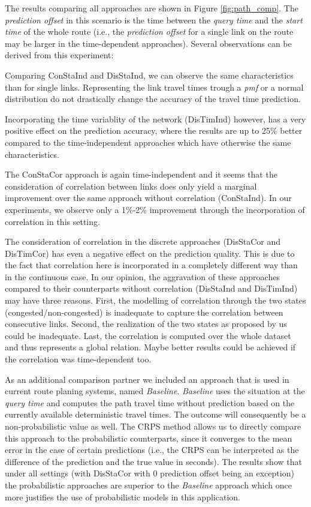 The results comparing all approaches are shown in Figure \ref{fig:path_comp}.
The \textit{prediction offset} in this scenario is the time between the
\textit{query time} and the \textit{start time} of the whole route (i.e., the
\textit{prediction offset} for a single link on the route may be larger in the
time-dependent approaches). Several observations can be derived from this
experiment:

Comparing ConStaInd and DisStaInd, we can observe the same characteristics than
for single links. Representing the link travel times trough a \textit{pmf} or a
normal distribution do not drastically change the accuracy of the travel time
prediction.

Incorporating the time variablity of the network (DisTimInd) however, has a very
positive effect on the prediction accuracy, where the results are up to 25\%
better compared to the time-independent approaches which have otherwise the same
characteristics.

The ConStaCor approach is again time-independent and it seems that the
consideration of correlation between links does only yield a marginal
improvement over the same approach without correlation (ConStaInd). In our
experiments, we observe only a 1\%-2\% improvement through the incorporation of
correlation in this setting.

The consideration of correlation in the discrete approaches (DisStaCor and
DisTimCor) has even a negative effect on the prediction quality. This is due to
the fact that correlation here is incorporated in a completely different way
than in the continuous case. In our opinion, the aggravation of these approaches
compared to their counterparts without correlation (DisStaInd and
DisTimInd) may have three reasons. First, the modelling of correlation
through the two states (congested/non-congested) is inadequate to capture the
correlation between consecutive links. Second, the realization of the two states
as proposed by us could be inadequate. Last, the correlation is computed over
the whole dataset and thus represents a global relation. Maybe better results
could be achieved if the correlation was time-dependent too.

As an additional comparison partner we included an approach that is used in
current route planing systems, named \textit{Baseline}. \textit{Baseline}
uses the situation at the \textit{query time} and computes the path travel time
without prediction based on the currently available deterministic travel times. The
outcome will consequently be a non-probabilistic value as well. The CRPS method allows
us to directly compare this approach to the probabilistic counterparts, since it
converges to the mean error in the case of certain predictions (i.e., the CRPS
can be interpreted as the difference of the prediction and the true value in
seconds). The results show that under all settings (with DisStaCor with 0
prediction offset being an exception) the probabilistic approaches are superior
to the \textit{Baseline} approach which once more justifies the use of
probabilistic models in this application.


